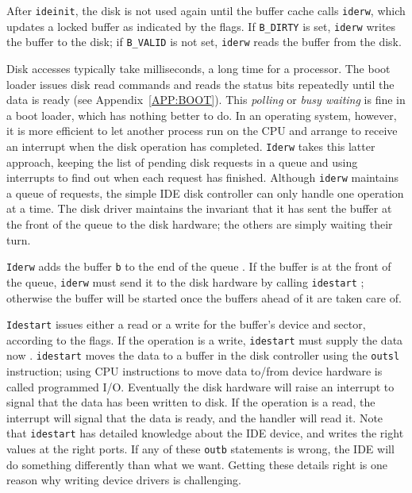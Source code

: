 After
\lstinline{ideinit},
the disk is not used again until the buffer cache calls
\lstinline{iderw},
which updates a locked buffer
as indicated by the flags.
If
\lstinline{B_DIRTY}
is set,
\lstinline{iderw}
writes the buffer
to the disk; if
\lstinline{B_VALID}
is not set,
\lstinline{iderw}
reads the buffer from the disk.

Disk accesses typically take milliseconds,
a long time for a processor.
The boot loader
issues disk read commands and reads the status
bits repeatedly until the data is ready (see Appendix~\ref{APP:BOOT}).
This 
\textit{polling} 
or 
\textit{busy waiting}
is fine in a boot loader, which has nothing better to do.
In an operating system, however, it is more efficient to
let another process run on the CPU and arrange to receive
an interrupt when the disk operation has completed.
\lstinline{Iderw}
takes this latter approach,
keeping the list of pending disk requests in a queue
and using interrupts to find out when each request has finished.
Although
\lstinline{iderw}
maintains a queue of requests,
the simple IDE disk controller can only handle
one operation at a time.
The disk driver maintains the invariant that it has sent
the buffer at the front of the queue to the disk hardware;
the others are simply waiting their turn.

\lstinline{Iderw}
adds the buffer
\lstinline{b}
to the end of the queue
.
If the buffer is at the front of the queue,
\lstinline{iderw}
must send it to the disk hardware
by calling
\lstinline{idestart}
;
otherwise the buffer will be started once
the buffers ahead of it are taken care of.

\lstinline{Idestart}
issues either a read or a write for the buffer's device and sector,
according to the flags.
If the operation is a write,
\lstinline{idestart}
must supply the data now
.
\lstinline{idestart}
moves the data to a buffer in the disk controller
using the
\lstinline{outsl}
instruction; 
using CPU instructions to move data to/from device hardware
is called programmed I/O.
Eventually the disk hardware will raise an
interrupt to signal that the data has been written to disk.
If the operation is a read, the interrupt will signal that the
data is ready, and the handler will read it.
Note that
\lstinline{idestart}
has detailed knowledge about the IDE device, and writes the right values at the
right ports.  If any of these 
\lstinline{outb}
statements is wrong, the IDE will do something differently than what we want.
Getting these details right is one reason why writing device drivers is
challenging.

